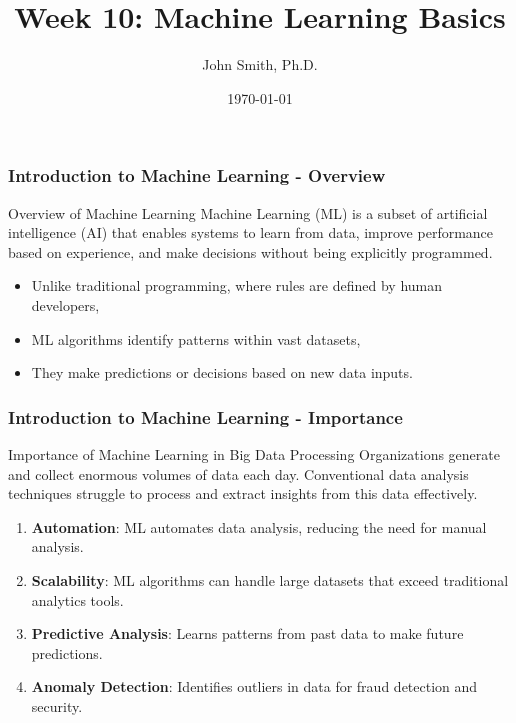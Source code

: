 \documentclass[aspectratio=169]{beamer}
\title[Machine Learning Basics]{Week 10: Machine Learning Basics}
\author[J. Smith]{John Smith, Ph.D.}
\institute[University Name]{
  Department of Computer Science\\
  University Name\\
  \vspace{0.3cm}
  Email: email@university.edu\\
  Website: www.university.edu
}
\date{\today}
\begin{document}
\frame{\titlepage}

\begin{frame}[fragile]
    \frametitle{Introduction to Machine Learning - Overview}
    \begin{block}{Overview of Machine Learning}
        Machine Learning (ML) is a subset of artificial intelligence (AI) that enables systems to learn from data, improve performance based on experience, and make decisions without being explicitly programmed.
    \end{block}
    
    \begin{itemize}
        \item Unlike traditional programming, where rules are defined by human developers,
        \item ML algorithms identify patterns within vast datasets,
        \item They make predictions or decisions based on new data inputs.
    \end{itemize}
\end{frame}

\begin{frame}[fragile]
    \frametitle{Introduction to Machine Learning - Importance}
    \begin{block}{Importance of Machine Learning in Big Data Processing}
        Organizations generate and collect enormous volumes of data each day.
        Conventional data analysis techniques struggle to process and extract insights from this data effectively.
    \end{block}

    \begin{enumerate}
        \item \textbf{Automation}: ML automates data analysis, reducing the need for manual analysis.
        \item \textbf{Scalability}: ML algorithms can handle large datasets that exceed traditional analytics tools.
        \item \textbf{Predictive Analysis}: Learns patterns from past data to make future predictions.
        \item \textbf{Anomaly Detection}: Identifies outliers in data for fraud detection and security.
    \end{enumerate}
\end{frame}
\end{document}
